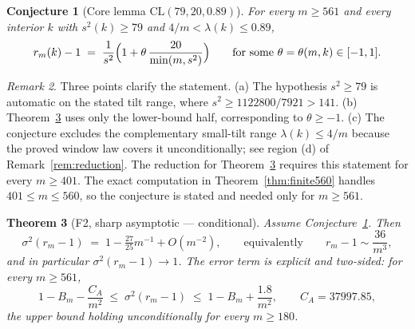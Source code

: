 \documentclass[11pt]{amsart}
\theoremstyle{plain}
\newtheorem{theorem}{Theorem}[section]
\newtheorem{conjecture}[theorem]{Conjecture}
\theoremstyle{definition}
\theoremstyle{remark}
\newtheorem{remark}[theorem]{Remark}
\begin{document}
\begin{conjecture}[Core lemma $\mathrm{CL}(79,20,0.89)$]
\label{conj:CL}
For every $m\ge561$ and every interior $k$ with $s^2(k)\ge79$ and
$4/m<\lambda(k)\le0.89$,
\[
r_m(k)-1 \;=\; \frac{1}{s^2}\Bigl(1+\theta\,\frac{20}{\min(m,s^2)}\Bigr)
\qquad\text{for some }\theta=\theta(m,k)\in[-1,1].
\]
\end{conjecture}

\begin{remark}
Three points clarify the statement. (a) The hypothesis $s^2\ge79$ is
automatic on the stated tilt range, where
$s^2\ge1122800/7921>141$. (b) Theorem~\ref{thm:F2} uses only the
lower-bound half, corresponding to $\theta\ge-1$. (c) The conjecture
excludes the complementary small-tilt range $\lambda(k)\le4/m$ because the
proved window law covers it unconditionally; see region (d) of
Remark~\ref{rem:reduction}. The reduction for Theorem~\ref{thm:F2}
requires this statement for every $m\ge401$. The exact computation in
Theorem~\ref{thm:finite560} handles $401\le m\le560$, so the conjecture is
stated and needed only for $m\ge561$.
\end{remark}

\begin{theorem}[F2, sharp asymptotic --- conditional]
\label{thm:F2}
Assume Conjecture~\ref{conj:CL}. Then
\[
\sigma^2(r_m-1) \;=\; 1-\tfrac{27}{25}m^{-1}+O(m^{-2}),
\qquad\text{equivalently}\qquad r_m-1 \sim \frac{36}{m^3},
\]
and in particular $\sigma^2(r_m-1)\to1$. The error term is explicit and
two-sided: for every $m\ge561$,
\[
1-B_m-\frac{C_A}{m^2} \;\le\; \sigma^2(r_m-1) \;\le\; 1-B_m+\frac{1.8}{m^2},
\qquad C_A=37997.85,
\]
the upper bound holding unconditionally for every $m\ge180$.
\end{theorem}
\end{document}
